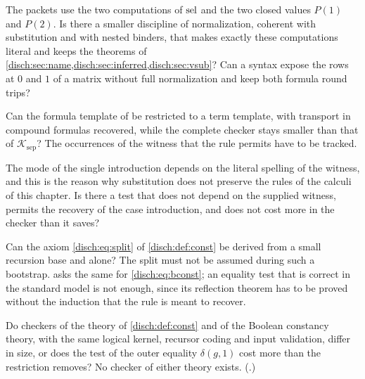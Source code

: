 \begin{question}
The packets use the two computations of $\operatorname{sel}$ and the two closed values
$P(1)$ and $P(2)$. Is there a smaller discipline of normalization,
coherent with substitution and with nested binders, that makes exactly
these computations literal and keeps the theorems of
\cref{disch:sec:name,disch:sec:inferred,disch:sec:vsub}? Can a syntax
expose the rows at $0$ and $1$ of a matrix without full normalization and
keep both formula round trips?
\end{question}

\begin{question}
Can the formula template of  be restricted to a term
template, with transport in compound formulas recovered, while the
complete checker stays smaller than that of $\mathcal K_{\mathrm{sep}}$?
The occurrences of the witness that the rule permits have to be tracked.
\end{question}

\begin{question}
The mode of the single introduction depends on the literal spelling of
the witness, and this is the reason why substitution does not preserve the
rules of the calculi of this chapter. Is there a test that does not depend
on the supplied witness, permits the recovery of the case introduction,
and does not cost more in the checker than it saves?
\end{question}

\begin{question}
Can the axiom \eqref{disch:eq:split} of \cref{disch:def:const} be derived
from a small recursion base and  alone? The split must not
be assumed during such a bootstrap.  asks the same
for  \eqref{disch:eq:bconst}; an equality test that is
correct in the standard model is not enough, since its reflection theorem
has to be proved without the induction that the rule is meant to recover.
\end{question}

\begin{question}
\label{disch:q:const-bool}
Do checkers of the theory of \cref{disch:def:const} and of the Boolean
constancy theory, with the same logical kernel, recursor coding and input
validation, differ in size, or does the test of the outer equality
$\delta(g,1)$ cost more than the restriction removes? No checker of either
theory exists. (.)
\end{question}

